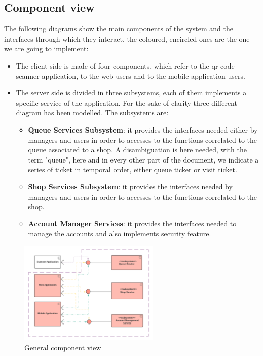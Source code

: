 \subsection{Component view}
\label{subsect:componentview}
The following diagrams show the main components of the system and the interfaces through which they interact, the coloured, encircled ones are the one we are going to implement:
\begin{itemize}
    \item The client side is made of four components, which refer to the qr-code scanner application, to the web users and to the mobile application users.
    \item The server side is divided in three subsystems, each of them implements a specific service of the application. For the sake of clarity three different diagram has been modelled. The subsystems are:
    \begin{itemize}
        \item \textbf{Queue Services Subsystem}: it provides the interfaces needed either by managers and users in order to accesses to the functions correlated to the queue associated to a shop. A disambiguation is here needed, with the term "queue", here and in every other part of the document, we indicate a series of ticket in temporal order, either queue ticker or visit ticket.
        \item \textbf{Shop Services Subsystem}: it provides the interfaces needed by managers and users in order to accesses to the functions correlated to the shop.
        \item \textbf{Account Manager Services}: it provides the interfaces needed to manage the accounts and also implements security feature.
    \end{itemize}
\end{itemize}
\begin{figure}[h!]
    \centering
    \includegraphics[width=0.6\textwidth]{Images/ComponentViewHighLevel (1).png}
    \caption{\label{fig:ComponentViewHighLevel}{General component view}}
\end{figure}

